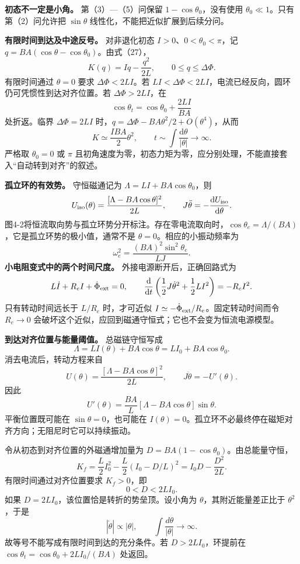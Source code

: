 \documentclass[12pt,a4paper,UTF8]{ctexart}
\begin{document}
\textbf{初态不一定是小角。} 第（3）---（5）问保留
\(1-\cos\theta_0\)，没有使用 \(\theta_0\ll1\)。只有第（2）问允许把
\(\sin\theta\) 线性化，不能把近似扩展到后续分问。

\textbf{有限时间到达及中途反号。} 对非退化初态
\(I>0\)、\(0<\theta_0<\pi\)，记
\(q=BA(\cos\theta-\cos\theta_0)\)。由式（27）， \[
K(q)=Iq-\frac{q^2}{2L},\qquad 0\le q\le\Delta\Phi.
\] 有限时间通过 \(\theta=0\) 要求 \(\Delta\Phi<2LI\)。若
\(LI<\Delta\Phi<2LI\)，电流已经反向，圆环仍可凭惯性到达对齐位置。若
\(\Delta\Phi>2LI\)，在 \[
\cos\theta_t=\cos\theta_0+\frac{2LI}{BA}
\] 处折返。临界 \(\Delta\Phi=2LI\)
时，\(q=\Delta\Phi-BA\theta^2/2+O(\theta^4)\)，从而 \[
K\simeq\frac{IBA}{2}\theta^2,
\qquad t\sim\int\frac{\mathrm d\theta}{|\theta|}\to\infty.
\] 严格取 \(\theta_0=0\) 或 \(\pi\)
且初角速度为零，初态力矩为零，应分别处理，不能直接套入``自动转到对齐''的叙述。

\textbf{孤立环的有效势。} 守恒磁通记为 \(\Lambda=LI+BA\cos\theta_0\)，则
\[
U_{\rm iso}(\theta)=\frac{[\Lambda-BA\cos\theta]^2}{2L},
\qquad J\ddot\theta=-\frac{\mathrm dU_{\rm iso}}{\mathrm d\theta}.
\]
图4-2将恒流取向势与孤立环势分开标注。存在零电流取向时，\(\cos\theta_e=\Lambda/(BA)\)，它是孤立环势的极小值，通常不是
\(\theta=0\)。相应的小振动频率为 \[
\omega_e^2=\frac{(BA)^2\sin^2\theta_e}{LJ}.
\] \textbf{小电阻变式中的两个时间尺度。} 外接电源断开后，正确回路式为 \[
L\dot I+R_eI+\dot\Phi_{\rm ext}=0,
\qquad \frac{\mathrm d}{\mathrm dt}\left(\frac12J\dot\theta^2+\frac12LI^2\right)=-R_eI^2.
\] 只有转动时间远长于 \(L/R_e\) 时，才可近似
\(I\simeq-\dot\Phi_{\rm ext}/R_e\)。固定转动时间而令 \(R_e\to0\)
会破坏这个近似，应回到磁通守恒式；它也不会变为恒流电源模型。

\textbf{到达对齐位置与能量阈值。} 总磁链守恒写成 \[
\Lambda=LI(\theta)+BA\cos\theta
=LI_0+BA\cos\theta_0.
\] 消去电流后，转动方程来自 \[
U(\theta)=\frac{[\Lambda-BA\cos\theta]^2}{2L},\qquad
J\ddot\theta=-U'(\theta).
\] 因此 \[
U'(\theta)=\frac{BA}{L}[\Lambda-BA\cos\theta]\sin\theta.
\] 平衡位置既可能在 \(\sin\theta=0\)，也可能在
\(I(\theta)=0\)。孤立环不必最终停在磁矩对齐方向；无阻尼时它可以持续振动。

令从初态到对齐位置的外磁通增加量为
\(D=BA(1-\cos\theta_0)\)。由总能量守恒， \[
K_f=\frac L2I_0^2-\frac L2(I_0-D/L)^2
=I_0D-\frac{D^2}{2L}.
\] 有限时间通过对齐位置要求 \(K_f>0\)，即 \[
0<D<2LI_0.
\] 如果 \(D=2LI_0\)，该位置恰是转折的势垒顶。设小角为
\(\theta\)，其附近能量差正比于 \(\theta^2\)，于是 \[
|\dot\theta|\propto|\theta|,\qquad
\int\frac{d\theta}{|\theta|}\to\infty.
\] 故等号不能写成有限时间到达的充分条件。若 \(D>2LI_0\)，环提前在
\(\cos\theta_t=\cos\theta_0+2LI_0/(BA)\) 处返回。
\end{document}
